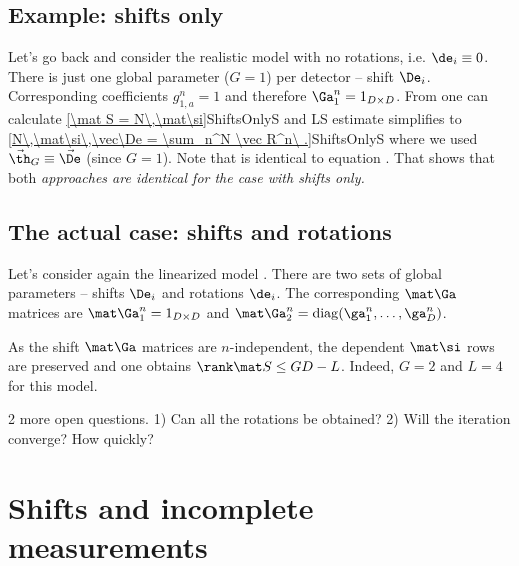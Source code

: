 \subsection{Example: shifts only}

Let's go back and consider the realistic model  with no rotations, i.e. $\de_i\equiv 0$. There is just one global parameter ($G=1$) per detector -- shift $\De_i$. Corresponding coefficients $g_{1,a}^n=1$ and therefore $\Ga_1^n = 1_{D\times D}$. From  one can calculate 
\eqref{\mat S = N\,\mat\si}{ShiftsOnlyS}
and LS estimate  simplifies to
\eqref{N\,\mat\si\,\vec\De = \sum_n^N \vec R^n\ .}{ShiftsOnlyS}
where we used $\vec\th_G\equiv\vec\De$ (since $G=1$). Note that  is identical to equation . That shows that both \em{approaches are identical} for the case with shifts only.




\subsection{The actual case: shifts and rotations}

Let's consider again the linearized model . There are two sets of global parameters -- shifts $\De_i$ and rotations $\de_i$. The corresponding $\mat\Ga$ matrices are $\mat\Ga_1^n = 1_{D\times D}$ and $\mat\Ga_2^n = {\rm diag}(\ga^n_1, \ldots, \ga_D^n)$.

As the shift $\mat\Ga$ matrices are $n$-independent, the dependent $\mat\si$ rows are preserved and one obtains $\rank\mat S\leq GD - L$. Indeed, $G=2$ and $L=4$ for this model.

2 more open questions. 1) Can all the rotations be obtained? 2) Will the iteration converge? How quickly?


\section{Shifts and incomplete measurements}


